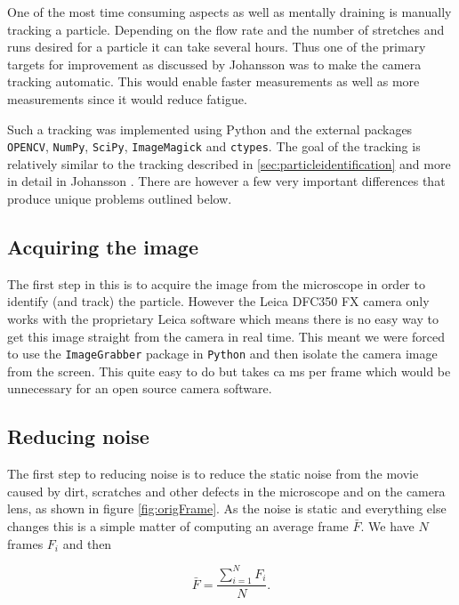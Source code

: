 %
%
%
%
%

One of the most time consuming aspects as well as mentally draining is manually tracking a particle. Depending on the flow rate and the number of stretches and runs desired for a particle it can take several hours. Thus one of the primary targets for improvement as discussed by Johansson \cite{AntonThesis} was to make the camera tracking automatic. This would enable faster measurements as well as more measurements since it would reduce fatigue. 

Such a tracking was implemented using Python and the external packages \texttt{OPENCV}, \texttt{NumPy}, \texttt{SciPy}, \texttt{ImageMagick} and \texttt{ctypes}. The goal of the tracking is relatively similar to the tracking described in \ref{sec:particleidentification} and more in detail in Johansson \cite{AntonThesis}. There are however a few very important differences that produce unique problems outlined below. 

\subsection{Acquiring the image}
The first step in this is to acquire the image from the microscope in order to identify (and track) the particle. However the Leica DFC350 FX camera only works with the proprietary Leica software which means there is no easy way to get this image straight from the camera in real time. This meant we were forced to use the \texttt{ImageGrabber} package in \texttt{Python} and then isolate the camera image from the screen. This quite easy to do but takes ca \unit[50]{ms} per frame which would be unnecessary for an open source camera software. 

\subsection{Reducing noise}
The first step to reducing noise is to reduce the static noise from the movie caused by dirt, scratches and other defects in the microscope and on the camera lens, as shown in figure \ref{fig:origFrame}. As the noise is static and everything else changes this is a simple matter of computing an average frame $\bar{F}$. We have $N$ frames $F_i$ and then 

\begin{equation}\label{eq:averageFrame}
\bar{F} = \frac{\sum\limits_{i=1}^{N} F_i}{N}.
\end{equation}

